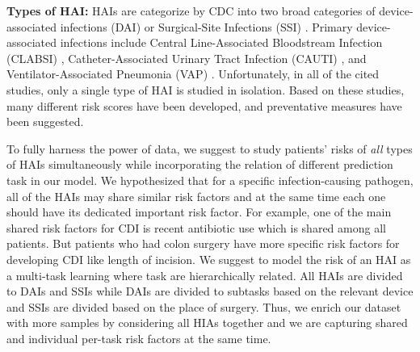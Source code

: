 {\bf Types of HAI:}
HAIs are categorize by CDC into two broad categories of device-associated infections (DAI) or Surgical-Site Infections (SSI) \cite{mu2011improving, de2006surgical, friedman2007alternative, chiang2014risk}. Primary device-associated infections include Central Line-Associated Bloodstream Infection (CLABSI) \cite{wylie2010risk, noaman2017improving, schoonover2017accurately, herc2017model, parreco2018predicting}, Catheter-Associated Urinary Tract Infection (CAUTI) \cite{grana2015detection, tambyah2004catheter, siddiq2012new}, and Ventilator-Associated Pneumonia (VAP) \cite{froon1998prediction, larsson2017risk, lisboa2008ventilator, kruger2011prognosis, mirsaeidi2009predicting}. Unfortunately, in all of the cited studies, only a single type of HAI is studied in isolation. Based on these studies, many different risk scores have been developed, and preventative measures have been suggested. 

To fully harness the power of data, we suggest to study patients' risks of \emph{all} types of HAIs simultaneously while incorporating the relation of different prediction task in our model. We hypothesized that for a specific infection-causing pathogen, all of the HAIs may share similar risk factors and at the same time each one should have its dedicated important risk factor. For example, one of the main shared risk factors for CDI is recent antibiotic use which is shared among all patients. But patients who had colon surgery have more specific risk factors for developing CDI like length of incision.
We suggest to model the risk of an HAI as a multi-task learning where task are hierarchically related. All HAIs are divided to DAIs and SSIs while DAIs are divided to subtasks based on the relevant device and SSIs are divided based on the place of surgery. Thus, we enrich our dataset with more samples by considering all HIAs together and we are capturing shared and individual per-task risk factors at the same time. 

